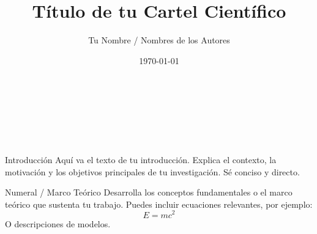 \documentclass[final]{beamer}
\title{Título de tu Cartel Científico}
\author{Tu Nombre / Nombres de los Autores}
\institute{Tu Institución o Afiliación}
\date{\today}
\begin{document}
\begin{frame}[t] %

\begin{center}
    \textbf{\Huge \inserttitle} \\ %
    \vspace{0.5cm}
    \Large \insertauthor \\ %
    \small \insertinstitute \\ %
    \vspace{0.8cm}
\end{center}

\begin{columns}[T] %

    \begin{column}{0.48\textwidth} %

        \begin{block}{Introducción}
            Aquí va el texto de tu introducción. Explica el contexto, la motivación
            y los objetivos principales de tu investigación. Sé conciso y directo.
        \end{block}

        \begin{block}{Numeral / Marco Teórico}
            Desarrolla los conceptos fundamentales o el marco teórico que sustenta tu trabajo.
            Puedes incluir ecuaciones relevantes, por ejemplo:
            $$ E = mc^2 $$
            O descripciones de modelos.
        \end{block}


\end{column}
\end{columns}
\end{frame}
\end{document}
